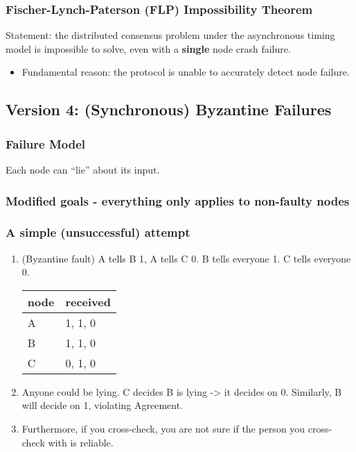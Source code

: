 \documentclass[11pt]{article}
\begin{document}
\subsubsection{Fischer-Lynch-Paterson (FLP) Impossibility Theorem}
\label{sec:org08bf464}
Statement: the distributed consensus problem under the asynchronous timing model
is impossible to solve, even with a \textbf{single} node crash failure.
\begin{itemize}
\item Fundamental reason: the protocol is unable to accurately detect node failure.
\end{itemize}
\subsection{Version 4: (Synchronous) Byzantine Failures}
\label{sec:orga765e45}
\subsubsection{Failure Model}
\label{sec:org50efbdb}
Each node can ``lie'' about its input.
\subsubsection{Modified goals - everything only applies to non-faulty nodes}
\label{sec:org47d2216}
\subsubsection{A simple (unsuccessful) attempt}
\label{sec:orgf24c6e9}
\begin{enumerate}
\item (Byzantine fault) A tells B 1, A tells C 0.
B tells everyone 1.
C tells everyone 0.
\begin{center}
\begin{tabular}{ll}
node & received\\
\hline
A & 1, 1, 0\\
B & 1, 1, 0\\
C & 0, 1, 0\\
\end{tabular}
\end{center}
\item Anyone could be lying. C decides B is lying -> it decides on 0. Similarly, B
will decide on 1, violating Agreement.
\item Furthermore, if you cross-check, you are not sure if the person you
cross-check with is reliable.
\end{enumerate}
\end{document}
